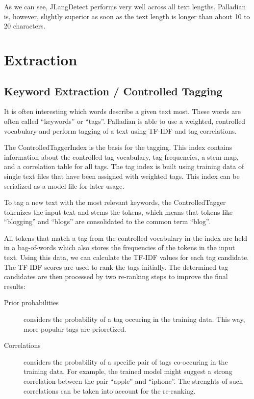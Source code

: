 As we can see, JLangDetect performs very well across all text lengths. Palladian is, however, slightly superior as soon as the text length is longer than about 10 to 20 characters.

\section{Extraction}

\subsection{Keyword Extraction / Controlled Tagging}
It is often interesting which words describe a given text most. These words are often called ``keywords'' or ``tags''. Palladian is able to use a weighted, controlled vocabulary and perform tagging of a text using TF-IDF and tag correlations.

The ControlledTaggerIndex is the basis for the tagging. This index contains information about the controlled tag vocabulary, tag frequencies, a stem-map, and a correlation table for all tags. The tag index is built using training data of single text files that have been assigned with weighted tags. This index can be serialized as a model file for later usage.

To tag a new text with the most relevant keywords, the ControlledTagger tokenizes the input text and stems the tokens, which means that tokens like ``blogging'' and ``blogs'' are consolidated to the common term ``blog''.

All tokens that match a tag from the controlled vocabulary in the index are held in a bag-of-words which also stores the frequencies of the tokens in the input text. Using this data, we can calculate the TF-IDF values for each tag candidate. The TF-IDF scores are used to rank the tags initially. The determined tag candidates are then processed by two re-ranking steps to improve the final results:

\begin{description}

	\item [Prior probabilities] considers the probability of a tag occuring in the training data. This way, more popular tags are prioretized.

	\item [Correlations] considers the probability of a specific pair of tags co-occuring in the training data. For example, the trained model might suggest a strong correlation between the pair ``apple'' and ``iphone''. The strenghts of such correlations can be taken into account for the re-ranking.

\end{description}

